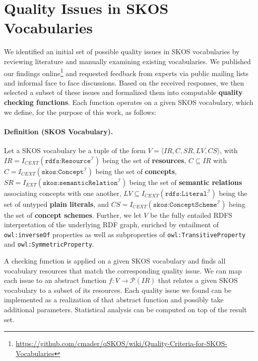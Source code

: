 
\section{Quality Issues in SKOS Vocabularies}\label{sec:criteria}


We identified an initial set of possible quality issues in SKOS vocabularies by reviewing literature and manually examining existing vocabularies. We published our findings online\footnote{\url{https://github.com/cmader/qSKOS/wiki/Quality-Criteria-for-SKOS-Vocabularies}} and requested feedback from experts via public mailing lists and informal face to face discussions. Based on the received responses, we then selected a subset of these issues and formalized them into computable \textbf{quality checking functions}. Each function operates on a given SKOS vocabulary, which we define, for the purpose of this work, as follows:

\paragraph{\textbf{Definition (SKOS Vocabulary).}}
Let a SKOS vocabulary be a tuple of the form $V = \langle IR, C, SR, LV, CS \rangle$, with \(IR = I_{CEXT}(\texttt{rdfs:Resource}^\mathcal{I})\) being the set of \textbf{resources}, \(C \subseteq IR\) with \(C = I_{CEXT}(\texttt{skos:Concept}^\mathcal{I})\) being the set of \textbf{concepts}, \(SR = I_{EXT}(\texttt{skos:semanticRelation}^\mathcal{I})\) being the set of \textbf{semantic relations} associating concepts with one another, $LV \subseteq I_{CEXT}(\texttt{rdfs:Literal}^\mathcal{I})$ being the set of untyped \textbf{plain literals}, and \(CS = I_{CEXT}(\texttt{skos:ConceptScheme}^\mathcal{I})\) being the set of \textbf{concept schemes}. Further, we let $V$ be the fully entailed RDFS interpretation of the underlying RDF graph, enriched by entailment of \texttt{owl:inverseOf} properties as well as subproperties of \texttt{owl:TransitiveProperty} and \texttt{owl:SymmetricProperty}. 

A checking function is applied on a given SKOS vocabulary and finds all vocabulary resources that match the corresponding quality issue. We can map each issue to an abstract function $f:V \rightarrow \mathcal{P}(IR)$ that relates a given SKOS vocabulary to a subset of its resources. Each quality issue we found can be implemented as a realization of that abstract function and possibly take additional parameters. Statistical analysis can be computed on top of the result set.

